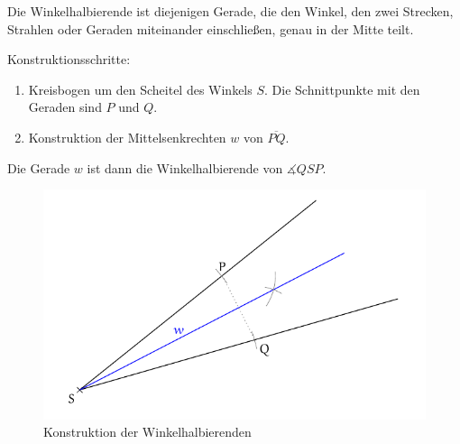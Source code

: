 \begin{regel}[Winkelhalbierende]

Die Winkelhalbierende ist diejenigen Gerade, die den Winkel, den zwei Strecken, Strahlen oder Geraden miteinander einschließen, genau in der Mitte teilt.

Konstruktionsschritte:
\begin{enumerate}
 \item Kreisbogen um den Scheitel des Winkels \(S\). Die Schnittpunkte mit den Geraden sind \(P\) und \(Q\).
 \item Konstruktion der Mittelsenkrechten \(w\) von \(\overline{PQ}\).
\end{enumerate}
Die Gerade \(w\) ist dann die Winkelhalbierende von \(\measuredangle QSP\).

\begin{figure}[t]
 \centering
 \includegraphics[width=\textwidth]{./winkelhalbierende.pdf}
 \caption{Konstruktion der Winkelhalbierenden}
 \label{fig:winkelhalbierende}
\end{figure}
\end{regel}

